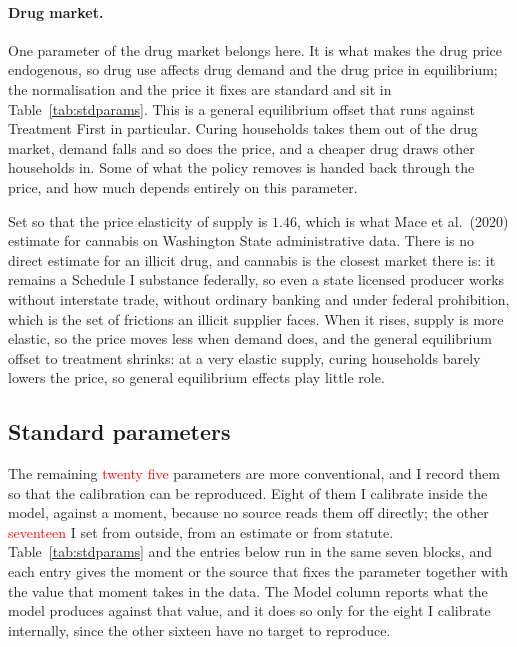 \documentclass[10pt]{article}
\begin{document}
\paragraph{Drug market.} One parameter of the drug market belongs here.
It is what makes the drug price endogenous, so drug use affects drug demand and the
drug price in equilibrium; the normalisation and the price it fixes are standard
and sit in Table~\ref{tab:stdparams}. This is a general equilibrium offset that
runs against Treatment First in particular. Curing households takes them out of the
drug market, demand falls and so does the price, and a cheaper drug draws other
households in. Some of what the policy removes is handed back through the price,
and how much depends entirely on this parameter.
\begin{description}\setlength{\itemsep}{0.25em}\setlength{\parskip}{0em}
\item[$\nu_2$, the drug supply curvature.] Set so that the price elasticity of
supply is $1.46$, which is what Mace et al.\ (2020) estimate for cannabis on
Washington State administrative data. There is no direct estimate for an illicit
drug, and cannabis is the closest market there is: it remains a Schedule I
substance federally, so even a state licensed producer works without interstate
trade, without ordinary banking and under federal prohibition, which is the set of
frictions an illicit supplier faces.
 When it rises, supply is more elastic, so the price moves less when demand does, and the general equilibrium offset to treatment shrinks: at a very elastic supply,
curing households barely lowers the price, so general equilibrium effects play
little role.
\end{description}

\subsection{Standard parameters}

The remaining \textcolor{red}{twenty five} parameters are more conventional, and I record them so
that the calibration can be reproduced. Eight of them I calibrate inside the model,
against a moment, because no source reads them off directly; the other \textcolor{red}{seventeen} I set
from outside, from an estimate or from statute. Table~\ref{tab:stdparams} and the
entries below run in the same seven blocks, and each entry gives the moment or the
source that fixes the parameter together with the value that moment takes in the
data. The Model column reports what the model produces against that value, and it
does so only for the eight I calibrate internally, since the other sixteen have no
target to reproduce.
\end{document}
